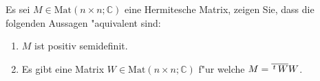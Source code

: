\documentclass[a4,11pt]{article}
\begin{document}
 \begin{aufgabe}[4 Punkte]
 Es sei $M \in \text{Mat}(n \times n; \mathbb{C})$ eine Hermitesche Matrix, zeigen Sie, dass die folgenden Aussagen "aquivalent sind:
 \begin{enumerate}
 \item $M$ ist positiv semidefinit.
 \item Es gibt eine Matrix $W \in \text{Mat}(n\times n;\mathbb{C})$ f"ur welche $M = \overline{\,^t\!\ W} W$.
 \end{enumerate}
 \end{aufgabe}


\end{document}
